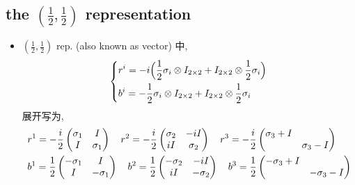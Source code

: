 \subsection{the \texorpdfstring{$(\frac{1}{2}, \frac{1}{2})$}{(1/2, 0)} representation}
\begin{itemize}
	\item $(\frac{1}{2}, \frac{1}{2})$ rep. (also known as vector) 中,
	\begin{equation}
		\begin{dcases}
			r^i = - i \Big( \frac{1}{2} \sigma_i \otimes I_{2 \times 2} + I_{2 \times 2} \otimes \frac{1}{2} \sigma_i \Big) \\
			b^i = - \frac{1}{2} \sigma_i \otimes I_{2 \times 2} + I_{2 \times 2} \otimes \frac{1}{2} \sigma_i
		\end{dcases}
	\end{equation}
	展开写为,
	\begin{align}
		& r^1 = - \frac{i}{2} \begin{pmatrix}
			\sigma_1 & I \\
			I & \sigma_1
		\end{pmatrix} \quad r^2 = - \frac{i}{2} \begin{pmatrix}
			\sigma_2 & - i I \\
			i I & \sigma_2
		\end{pmatrix} \quad r^3 = - \frac{i}{2} \begin{pmatrix}
			\sigma_3 + I & \\
			& \sigma_3 - I
		\end{pmatrix} \notag \\
		& b^1 = \frac{1}{2} \begin{pmatrix}
			- \sigma_1 & I \\
			I & - \sigma_1
		\end{pmatrix} \quad b^2 = \frac{1}{2} \begin{pmatrix}
			- \sigma_2 & - i I \\
			i I & - \sigma_2
		\end{pmatrix} \quad b^3 = \frac{1}{2} \begin{pmatrix}
			- \sigma_3 + I & \\
			& - \sigma_3 - I
		\end{pmatrix}
	\end{align}
\end{itemize}
